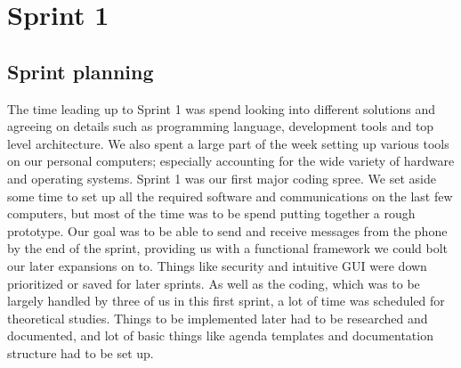 \chapter{Sprint 1}

\section{Sprint planning}
The time leading up to Sprint 1 was spend looking into different solutions and agreeing on details such as programming language, development tools and top level architecture. We also spent a large part of the week setting up various tools on our personal computers; especially accounting for the wide variety of hardware and operating systems.
\newline
\newline
Sprint 1 was our first major coding spree. We set aside some time to set up all the required software and communications on the last few computers, but most of the time was to be spend putting together a rough prototype. Our goal was to be able to send and receive messages from the phone by the end of the sprint, providing us with a functional framework we could bolt our later expansions on to. Things like security and intuitive GUI were down prioritized or saved for later sprints.
\newline
\newline
As well as the coding, which was to be largely handled by three of us in this first sprint, a lot of time was scheduled for theoretical studies. Things to be implemented later had to be researched and documented, and lot of basic things like agenda templates and documentation structure had to be set up.